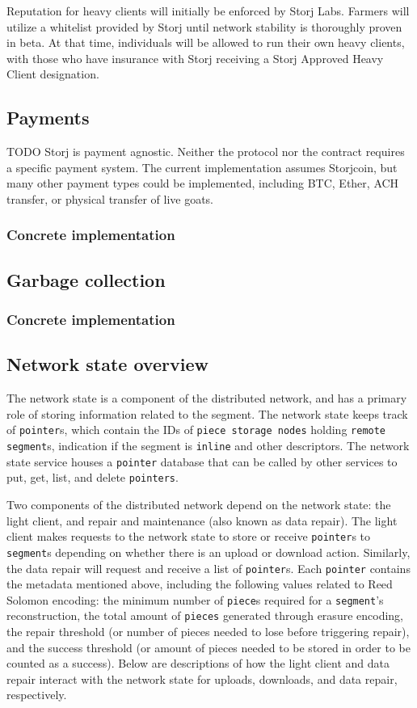 \documentclass[a4paper,10pt]{article} \usepackage[utf8]{inputenc}
\newcommand{\x}[1]{{\tt #1}} \newcommand{\code}[1]{{\tt #1}}
\newcommand{\todo}[1]{{\color{red} TODO #1}}
\begin{document}
Reputation for heavy clients will initially be enforced by Storj Labs. Farmers will utilize a whitelist provided by Storj until network stability is thoroughly proven in beta. At that time, individuals will be allowed to run their own heavy clients, with those who have insurance with Storj receiving a Storj Approved Heavy Client designation. 

\subsection{Payments}

\todo{ Storj is payment agnostic. Neither the protocol nor the contract requires
a specific payment system. The current implementation assumes Storjcoin, but
many other payment types could be implemented, including BTC, Ether, ACH
transfer, or physical transfer of live goats. }

\subsubsection{Concrete implementation}

\subsection{Garbage collection}

\subsubsection{Concrete implementation}


\subsection{Network state overview} The network state is a
component of the
distributed network, and has a primary role of storing information related to
the segment. The network state keeps track of \x{pointer}s, which contain the
IDs of \x{piece storage nodes} holding \x{remote segment}s, indication if the
segment is \x{inline} and other descriptors. The network state service houses a
\x{pointer} database that can be called by other services to put, get, list, and
delete \x{pointers}.

Two components of the distributed network depend on the network state: the
light client, and repair and maintenance (also known as data repair). The light
client makes requests to the network state to store or receive \x{pointer}s to
\x{segment}s depending on whether there is an upload or download action.
Similarly, the data repair will request and receive a list of \x{pointer}s. Each
\x{pointer} contains the metadata mentioned above, including the following
values related to Reed Solomon encoding: the minimum number of \x{piece}s
required for a \x{segment}'s reconstruction, the total amount of \x{pieces}
generated through erasure encoding, the repair threshold (or number of pieces
needed to lose before triggering repair), and the success threshold (or amount
of pieces needed to be stored in order to be counted as a success). Below are
descriptions of how the light client and data repair interact with the network
state for uploads, downloads, and data repair, respectively.
\end{document}
